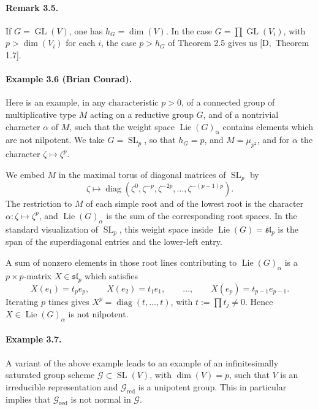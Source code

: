 \documentclass[11pt]{article}
\newcommand{\Lie}{\operatorname{Lie}}
\newcommand{\GL}{\operatorname{GL}}
\newcommand{\red}{\mathrm{red}}
\newcommand{\SL}{\operatorname{SL}}
\newcommand{\diag}{\operatorname{diag}}
\begin{document}
\paragraph{Remark 3.5.}
If \(G=\GL(V)\), one has \(h_G=\dim(V)\). In the case
\(G=\prod \GL(V_i)\), with \(p>\dim(V_i)\) for each \(i\), the case \(p>h_G\) of
Theorem 2.5 gives us \([\mathrm D,\) Theorem 1.7].

\paragraph{Example 3.6 (Brian Conrad).}
Here is an example, in any characteristic \(p>0\), of a connected group of multiplicative
type \(M\) acting on a reductive group \(G\), and of a nontrivial character \(\alpha\) of
\(M\), such that the weight space \(\Lie(G)_\alpha\) contains elements which are not
nilpotent. We take \(G=\SL_p\), so that \(h_G=p\), and \(M=\mu_{p^2}\), and for
\(\alpha\) the character \(\zeta\mapsto\zeta^p\).

We embed \(M\) in the maximal torus of diagonal matrices of \(\SL_p\) by
\[
  \zeta\longmapsto \diag(\zeta^0,\zeta^{-p},\zeta^{-2p},\ldots,\zeta^{-(p-1)p}).
\]
The restriction to \(M\) of each simple root and of the lowest root is the character
\(\alpha:\zeta\mapsto\zeta^p\), and \(\Lie(G)_\alpha\) is the sum of the corresponding
root spaces. In the standard visualization of \(\SL_p\), this weight space inside
\(\Lie(G)=\mathfrak{sl}_p\) is the span of the superdiagonal entries and the lower-left
entry.

A sum of nonzero elements in those root lines contributing to \(\Lie(G)_\alpha\) is a
\(p\times p\)-matrix \(X\in\mathfrak{sl}_p\) which satisfies
\begin{equation}
  X(e_1)=t_p e_p,\qquad X(e_2)=t_1 e_1,
  \qquad\ldots,\qquad X(e_p)=t_{p-1}e_{p-1}.
  \tag{3.6.1}
\end{equation}
Iterating \(p\) times gives \(X^p=\diag(t,\ldots,t)\), with \(t:=\prod t_j\ne0\).
Hence \(X\in\Lie(G)_\alpha\) is not nilpotent.

\paragraph{Example 3.7.}
A variant of the above example leads to an example of an infinitesimally saturated group
scheme \(\mathcal G\subset\SL(V)\), with \(\dim(V)=p\), such that \(V\) is an
irreducible representation and \(\mathcal G_{\red}\) is a unipotent group. This in
particular implies that \(\mathcal G_{\red}\) is not normal in \(\mathcal G\).
\end{document}
